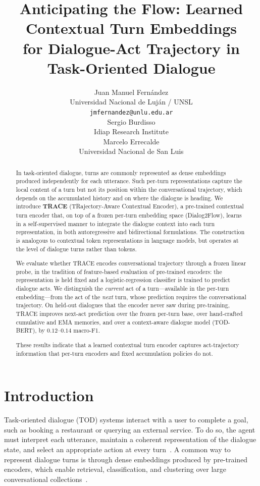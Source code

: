 \documentclass[11pt]{article}
\title{Anticipating the Flow: Learned Contextual Turn Embeddings\\ for Dialogue-Act Trajectory in Task-Oriented Dialogue}
\author{Juan Manuel Fern\'andez \\
  Universidad Nacional de Luj\'an / UNSL \\
  \texttt{jmfernandez@unlu.edu.ar} \\\And
  Sergio Burdisso \\
  Idiap Research Institute \\\And
  Marcelo Errecalde \\
  Universidad Nacional de San Luis}
\begin{document}
\maketitle

\begin{abstract}
In task-oriented dialogue, turns are commonly represented as dense embeddings produced
independently for each utterance. Such per-turn representations capture the local content of a
turn but not its position within the conversational trajectory, which depends on the accumulated
history and on where the dialogue is heading. We introduce \textbf{TRACE} (TRajectory-Aware
Contextual Encoder), a pre-trained contextual turn encoder that, on top of a frozen per-turn
embedding space (Dialog2Flow), learns in a self-supervised manner to integrate the dialogue
context into each turn representation, in both autoregressive and bidirectional formulations. The
construction is analogous to contextual token representations in language models, but operates at
the level of dialogue turns rather than tokens.

We evaluate whether TRACE encodes conversational trajectory through a frozen linear probe, in the
tradition of feature-based evaluation of pre-trained encoders: the representation is held fixed and
a logistic-regression classifier is trained to predict dialogue acts. We distinguish the
\emph{current} act of a turn---available in the per-turn embedding---from the act of the
\emph{next} turn, whose prediction requires the conversational trajectory. On held-out dialogues
that the encoder never saw during pre-training, TRACE improves next-act prediction over the frozen
per-turn base, over hand-crafted cumulative and EMA memories, and over a context-aware dialogue
model (TOD-BERT), by $0.12$--$0.14$ macro-F1.

These results indicate that a learned contextual turn encoder captures act-trajectory information
that per-turn encoders and fixed accumulation policies do not.
\end{abstract}

\section{Introduction}
\label{sec:intro}

Task-oriented dialogue (TOD) systems interact with a user to complete a goal, such as booking a
restaurant or querying an external service. To do so, the agent must interpret each utterance,
maintain a coherent representation of the dialogue state, and select an appropriate action at every
turn~\cite{young2013pomdp,chen2017survey}. A common way to represent dialogue turns is through
dense embeddings produced by pre-trained encoders, which enable retrieval, classification, and
clustering over large conversational collections~\cite{devlin2019bert,reimers2019sentencebert}.
\end{document}
